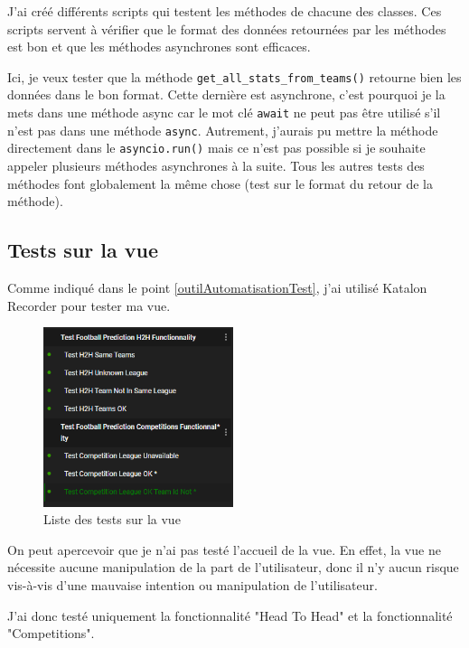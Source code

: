 \documentclass[a4paper,14pt]{extarticle}
\begin{document}
{J'ai créé différents scripts qui testent les méthodes de chacune des classes. Ces scripts servent à vérifier que le format des données retournées par les méthodes est bon et que les méthodes asynchrones sont efficaces.


Ici, je veux tester que la méthode \texttt{get\_all\_stats\_from\_teams()} retourne bien les données dans le bon format. Cette dernière est asynchrone, c'est pourquoi je la mets dans une méthode async car le mot clé \texttt{await} ne peut pas être utilisé s'il n'est pas dans une méthode \texttt{async}. Autrement, j'aurais pu mettre la méthode directement dans le \texttt{asyncio.run()} mais ce n'est pas possible si je souhaite appeler plusieurs méthodes asynchrones à la suite.
Tous les autres tests des méthodes font globalement la même chose (test sur le format du retour de la méthode).

\subsection{Tests sur la vue}

Comme indiqué dans le point \ref{outilAutomatisationTest}, j'ai utilisé Katalon Recorder pour tester ma vue.

\begin{figure}[htp]
    \centering
    \includegraphics[width=15em]{../img/katalonTestsSurVue.png}
    \caption{Liste des tests sur la vue}
    \label{fig:predictionMadeH2H}
\end{figure}

On peut apercevoir que je n'ai pas testé l'accueil de la vue. En effet, la vue ne nécessite aucune manipulation de la part de l'utilisateur, donc il n'y aucun risque vis-à-vis d'une mauvaise intention ou manipulation de l'utilisateur.

J'ai donc testé uniquement la fonctionnalité "Head To Head" et la fonctionnalité "Competitions". 

\newpage

}
\end{document}
